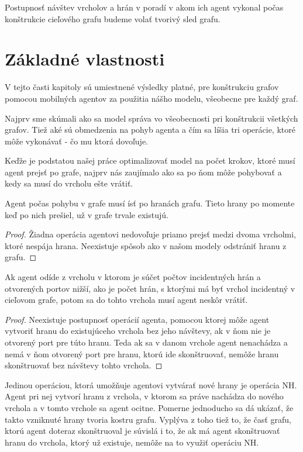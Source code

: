 \begin{ozn}
Postupnosť návštev vrcholov a hrán v poradí v akom ich agent vykonal počas
konštrukcie cieľového grafu budeme volať tvorivý sled grafu.
\end{ozn}

\section{Základné vlastnosti}
V tejto časti kapitoly sú umiestnené výsledky platné, pre konštrukciu grafov
pomocou mobilných agentov za použitia nášho modelu, všeobecne pre každý
graf.

Najprv sme skúmali ako sa model správa vo všeobecnosti pri konštrukcii
všetkých grafov. Tiež aké sú obmedzenia na pohyb agenta a čím sa líšia tri
operácie, ktoré môže vykonávať - čo mu ktorá dovoľuje.

Keďže je podstatou našej práce optimalizovať model na počet krokov, ktoré
musí agent prejsť po grafe, najprv nás zaujímalo ako sa po ňom môže
pohybovať a kedy sa musí do vrcholu ešte vrátiť.

\begin{lem}
Agent počas pohybu v grafe musí ísť po hranách grafu. 
Tieto hrany po momente keď po nich prešiel, už v grafe trvale existujú.
\end{lem}

\begin{proof}
Žiadna operácia agentovi nedovoľuje priamo prejsť medzi dvoma vrcholmi, ktoré
nespája hrana. Neexistuje spôsob ako v našom modely odstrániť hranu z grafu.
\end{proof}

\begin{lem}
Ak agent odíde z vrcholu v ktorom je súčet počtov incidentných hrán a
otvorených portov nižší, ako je počet hrán, s ktorými má byť vrchol
incidentný v cieľovom grafe, potom sa do tohto vrchola musí agent
neskôr vrátiť.
\end{lem}

\begin{proof}
Neexistuje postupnosť operácií agenta, pomocou ktorej môže agent vytvoriť
hranu do
existujúceho vrchola bez jeho návštevy, ak v ňom nie je otvorený port pre
túto hranu. 
Teda ak sa
v danom vrchole agent nenachádza a nemá v ňom otvorený port pre hranu,
ktorú ide skonštruovať, nemôže hranu skonštruovať bez návštevy tohto vrchola.
\end{proof}

Jedinou operáciou, ktorá umožňuje agentovi vytvárať nové hrany je operácia
NH. Agent pri nej vytvorí hranu z vrchola, v ktorom sa práve nachádza do
nového vrchola a v tomto vrchole sa agent ocitne. Pomerne jednoducho sa dá
ukázať, že takto vzniknuté hrany tvoria kostru grafu. Vyplýva z toho tiež
to, že časť grafu, ktorú agent doteraz skonštruoval je súvislá i to, že ak
má agent skonštruovať hranu do vrchola, ktorý už existuje, nemôže na to
využiť operáciu NH.

